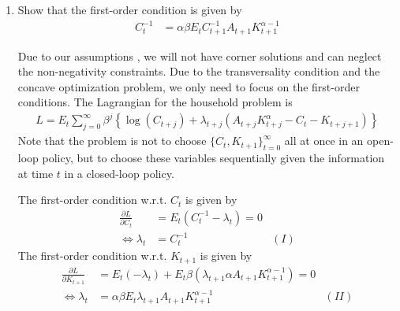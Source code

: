 \begin{enumerate}
    \item Show that the first-order condition is given by
          \begin{align*}
              C_t^{-1} & = \alpha \beta E_t C_{t+1}^{-1} A_{t+1} K_{t+1}^{\alpha-1}
          \end{align*}
          \begin{solution}
              Due to our assumptions , we will not have corner solutions and can neglect the non-negativity constraints. Due to the transversality condition and the concave optimization problem, we only need to focus on the first-order conditions.
              The Lagrangian for the household problem is
              \begin{align*}
                  L = E_t\sum_{j=0}^{\infty}\beta^j\left\{\log(C_{t+j}) + \lambda_{t+j} \left(A_{t+j}K_{t+j}^\alpha -C_t - K_{t+j+1}\right)\right\}
              \end{align*}
              Note that the problem is not to choose $\{C_t,K_{t+1}\}_{t=0}^\infty$ all at once in an open-loop policy, but to choose these variables sequentially given the information at time $t$ in a closed-loop policy.

              The first-order condition w.r.t. $C_t$ is given by
              \begin{align*}
                  \frac{\partial L}{\partial C_{t}} & = E_t \left(C_t^{-1}-\lambda_{t}\right) = 0       \\
                  \Leftrightarrow \lambda_{t}       & = C_{t}^{-1}                                & (I)
              \end{align*}
              The first-order condition w.r.t. $K_{t+1}$ is given by
              \begin{align*}
                  \frac{\partial L}{\partial K_{t+1}} & = E_t (-\lambda_{t}) +
                  E_t \beta \left(\lambda_{t+1}\alpha A_{t+1} K_{t+1}^{\alpha-1}\right) = 0                              \\
                  \Leftrightarrow \lambda_{t}         & = \alpha\beta E_t \lambda_{t+1}A_{t+1} K_{t+1}^{\alpha-1} & (II)
              \end{align*}


\end{solution}
\end{enumerate}
